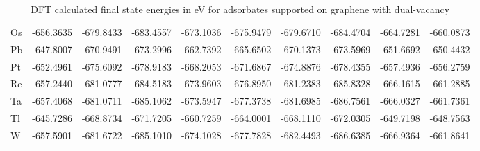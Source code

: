 \begin{table}[h]
{\begin{tabular}{*{10}{l}}
    Os & -656.3635 & -679.8433 & -683.4557 & -673.1036 & -675.9479 & -679.6710 & -684.4704 & -664.7281 & -660.0873 \\
    Pb & -647.8007 & -670.9491 & -673.2996 & -662.7392 & -665.6502 & -670.1373 & -673.5969 & -651.6692 & -650.4432 \\
    Pt & -652.4961 & -675.6092 & -678.9183 & -668.2053 & -671.6867 & -674.8876 & -678.4355 & -657.4936 & -656.2759 \\
    Re & -657.2440 & -681.0777 & -684.5183 & -673.9603 & -676.8950 & -681.2383 & -685.8328 & -666.1615 & -661.2885 \\
    Ta & -657.4068 & -681.0711 & -685.1062 & -673.5947 & -677.3738 & -681.6985 & -686.7561 & -666.0327 & -661.7361 \\
    Tl & -645.7286 & -668.8734 & -671.7205 & -660.7259 & -664.0001 & -668.1110 & -672.0305 & -649.7198 & -648.7563 \\
    W  & -657.5901 & -681.6722 & -685.1010 & -674.1028 & -677.7828 & -682.4493 & -686.6385 & -666.9364 & -661.8641 \\
    \hline
  \end{tabular}
  }
  \caption{DFT calculated final state energies in eV for adsorbates supported on graphene with dual-vacancy}
  \label{si_table6:e_vac_gra}
\end{table}


